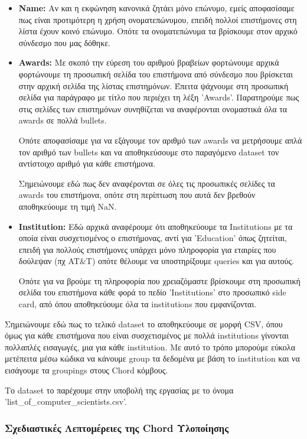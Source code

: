 \documentclass[12pt,a4paper]{article}
\begin{document}
\begin{itemize}
	\item \textbf{Name:} Αν και η εκφώνηση κανονικά ζητάει μόνο επώνυμο, εμείς αποφασίσαμε πως είναι προτιμότερη η χρήση ονοματεπώνυμου, επειδή πολλοί επιστήμονες στη λίστα έχουν κοινό επώνυμο. Οπότε τα ονοματεπώνυμα τα βρίσκουμε στον αρχικό σύνδεσμο που μας δόθηκε.
	\item \textbf{Awards:} Με σκοπό την εύρεση του αριθμού βραβείων φορτώνουμε αρχικά φορτώνουμε τη προσωπική σελίδα του επιστήμονα από σύνδεσμο που βρίσκεται στην αρχική σελίδα της λίστας επιστημόνων. Έπειτα ψάχνουμε στη προσωπική σελίδα για παράγραφο με τίτλο που περιέχει τη λέξη 'Awards'. Παρατηρούμε πως στις σελίδες των επιστημόνων συνηθίζεται να αναφέρονται ονομαστικά όλα τα awards σε πολλά bullets.

	      Οπότε αποφασίσαμε για να εξάγουμε τον αριθμό των awards να μετρήσουμε απλά τον αριθμό των bullets και να αποθηκεύσουμε στο παραγόμενο dataset τον αντίστοιχο αριθμό για κάθε επιστήμονα.

	      Σημειώνουμε εδώ πως δεν αναφέρονται σε όλες τις προσωπικές σελίδες τα awards του επιστήμονα, οπότε στη περίπτωση που αυτά δεν βρεθούν αποθηκεύουμε τη τιμή NaN.
	\item \textbf{Institution:} Εδώ αρχικά αναφέρουμε ότι αποθηκεύουμε τα Institutions με τα οποία είναι συσχετισμένος ο επιστήμονας, αντί για 'Education' όπως ζητείται, επειδή για πολλούς επιστήμονες υπάρχει μόνο πληροφορία για εταιρίες που δούλεψαν (πχ AT\&T) οπότε θέλουμε να υποστηρίξουμε queries και για αυτούς.

	      Οπότε για να βρούμε τη πληροφορία που χρειαζόμαστε βρίσκουμε στη προσωπική σελίδα του επιστήμονα κάθε φορά το πεδίο 'Institutions' στο προσωπικό side card, από όπου αποθηκεύουμε όλα τα institutions που εμφανίζονται.
\end{itemize}

Σημειώνουμε εδώ πως το τελικό dataset το αποθηκεύουμε σε μορφή CSV, όπου όμως για κάθε επιστήμονα που είναι συσχετισμένος με πολλά institutions γίνονται πολλαπλές εισαγωγές, μια για κάθε institution. Με αυτό το τρόπο μπορούμε εύκολα μετέπειτα μέσω κώδικα να κάνουμε group τα δεδομένα με βάση το institution και να εισάγουμε τα groupings στους Chord κόμβους.

Το dataset το παρέχουμε στην υποβολή της εργασίας με το όνομα\\'list\_of\_computer\_scientists.csv'.

\subsubsection{Σχεδιαστικές Λεπτομέρειες της Chord Υλοποίησης}
\end{document}

